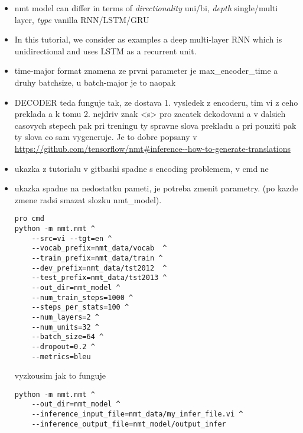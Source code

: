 \begin{itemize}
  \item nmt model can differ in terms of \emph{directionality} uni/bi, \emph{depth} single/multi layer, \emph{type} vanilla RNN/LSTM/GRU
  \item In this tutorial, we consider as examples a deep multi-layer RNN which is unidirectional and uses LSTM as a recurrent unit.
  \item time-major format znamena ze prvni parameter je max\_encoder\_time a druhy batchsize, u batch-major je to naopak
  \item DECODER teda funguje tak, ze dostava 1. vysledek z encoderu, tim vi z ceho preklada a k tomu 2. nejdriv znak <s> pro zacatek dekodovani a v dalsich casovych stepech pak pri treningu ty spravne slova prekladu a pri pouziti pak ty slova co sam vygeneruje. Je to dobre popsany v \url{https://github.com/tensorflow/nmt#inference--how-to-generate-translations}
  \item ukazka z tutorialu v gitbashi spadne s encoding problemem, v cmd ne
  \item ukazka spadne na nedostatku pameti, je potreba zmenit parametry. (po kazde zmene radsi smazat slozku nmt\_model).
      \begin{lstlisting}
pro cmd
python -m nmt.nmt ^
    --src=vi --tgt=en ^
    --vocab_prefix=nmt_data/vocab  ^
    --train_prefix=nmt_data/train ^
    --dev_prefix=nmt_data/tst2012  ^
    --test_prefix=nmt_data/tst2013 ^
    --out_dir=nmt_model ^
    --num_train_steps=1000 ^
    --steps_per_stats=100 ^
    --num_layers=2 ^
    --num_units=32 ^
    --batch_size=64 ^
    --dropout=0.2 ^
    --metrics=bleu
    \end{lstlisting}
vyzkousim jak to funguje
\begin{lstlisting}
python -m nmt.nmt ^
    --out_dir=nmt_model ^
    --inference_input_file=nmt_data/my_infer_file.vi ^
    --inference_output_file=nmt_model/output_infer
\end{lstlisting}
\end{itemize}

